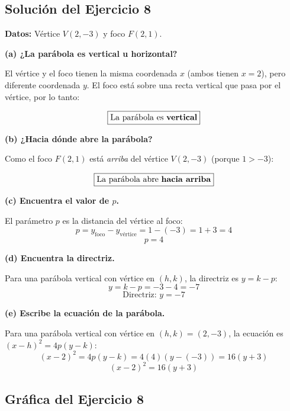 \documentclass[12pt,a4paper]{article}
\begin{document}

	\subsection*{Solución del Ejercicio 8}

	\textbf{Datos:} Vértice \(V(2,-3)\) y foco \(F(2,1)\).

	\bigskip

	\textbf{(a) ¿La parábola es vertical u horizontal?}

	El vértice y el foco tienen la misma coordenada \(x\) (ambos tienen \(x=2\)), pero diferente coordenada \(y\). El foco está sobre una recta vertical que pasa por el vértice, por lo tanto:

	\[
	\boxed{\text{La parábola es \textbf{vertical}}}
	\]

	\textbf{(b) ¿Hacia dónde abre la parábola?}

	Como el foco \(F(2,1)\) está \emph{arriba} del vértice \(V(2,-3)\) (porque \(1>-3\)):

	\[
	\boxed{\text{La parábola abre \textbf{hacia arriba}}}
	\]

	\textbf{(c) Encuentra el valor de \(p\).}

	El parámetro \(p\) es la distancia del vértice al foco:
	\[
	p = y_{\text{foco}} - y_{\text{vértice}} = 1-(-3)=1+3=4
	\]
	\[
	\boxed{p=4}
	\]

	\textbf{(d) Encuentra la directriz.}

	Para una parábola vertical con vértice en \((h,k)\), la directriz es \(y=k-p\):
	\[
	y=k-p=-3-4=-7
	\]
	\[
	\boxed{\text{Directriz: } y=-7}
	\]

	\textbf{(e) Escribe la ecuación de la parábola.}

	Para una parábola vertical con vértice en \((h,k)=(2,-3)\), la ecuación es \((x-h)^2=4p(y-k)\):
	\[
	(x-2)^2=4p(y-k)=4(4)(y-(-3))=16(y+3)
	\]
	\[
	\boxed{(x-2)^2=16(y+3)}
	\]

	\subsection*{Gráfica del Ejercicio 8}
\end{document}
